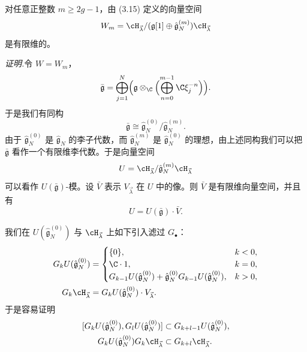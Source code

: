 \begin{proposition}[3.7]
对任意正整数 $m\ge 2g-1$，由 (3.15) 定义的向量空间
\[
W_m=\cH_{\vec{\lambda}}/(\mathfrak{g}[1]\oplus\hat{\mathfrak{g}}_N^{(m)})\cH_{\vec{\lambda}}
\]
是有限维的。
\end{proposition}

\noindent\textit{证明.}\quad 令 $W=W_m$，
\[
\bar{\mathfrak{g}}=\bigoplus_{j=1}^{N}\Bigl(\mathfrak{g}\otimes_{\C}\Bigl(\bigoplus_{n=0}^{m-1}\C\xi_j^{-n}\Bigr)\Bigr).
\]
于是我们有同构
\begin{equation}
\bar{\mathfrak{g}}\cong\hat{\mathfrak{g}}_N^{(0)}/\hat{\mathfrak{g}}_N^{(m)}. \tag{3.19}
\end{equation}
由于 $\hat{\mathfrak{g}}_N^{(0)}$ 是 $\hat{\mathfrak{g}}_N$ 的李子代数，而 $\hat{\mathfrak{g}}_N^{(m)}$ 是 $\hat{\mathfrak{g}}_N^{(0)}$ 的理想，由上述同构我们可以把 $\bar{\mathfrak{g}}$ 看作一个有限维李代数。于是向量空间
\[
U=\cH_{\vec{\lambda}}/\hat{\mathfrak{g}}_N^{(m)}\cH_{\vec{\lambda}}
\]
可以看作 $U(\bar{\mathfrak{g}})$-模。设 $\bar V$ 表示 $V_{\vec{\lambda}}$ 在 $U$ 中的像。则 $\bar V$ 是有限维向量空间，并且有
\begin{equation}
U=U(\bar{\mathfrak{g}})\cdot\bar V. \tag{3.20}
\end{equation}

我们在 $U(\hat{\mathfrak{g}}_N^{(0)})$ 与 $\cH_{\vec{\lambda}}$ 上如下引入滤过 $G_{\bullet}$：
\[
\begin{aligned}
G_kU(\hat{\mathfrak{g}}_N^{(0)})&=
\begin{cases}
\{0\}, & k<0,\\
\C\cdot1, & k=0,\\
G_{k-1}U(\hat{\mathfrak{g}}_N^{(0)})+\hat{\mathfrak{g}}_N^{(0)}G_{k-1}U(\hat{\mathfrak{g}}_N^{(0)}), & k>0,
\end{cases}\\
G_k\cH_{\vec{\lambda}}&=G_kU(\hat{\mathfrak{g}}_N^{(0)})\cdot V_{\vec{\lambda}}.
\end{aligned}
\]
于是容易证明
\[
\begin{aligned}
[G_kU(\hat{\mathfrak{g}}_N^{(0)}),G_lU(\hat{\mathfrak{g}}_N^{(0)})]&\subset G_{k+l-1}U(\hat{\mathfrak{g}}_N^{(0)}),\\
G_kU(\hat{\mathfrak{g}}_N^{(0)})G_k\cH_{\vec{\lambda}}&\subset G_{k+l}\cH_{\vec{\lambda}}.
\end{aligned}
\]


